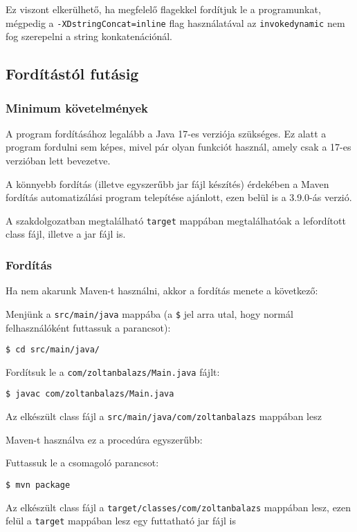 Ez viszont elkerülhető, ha megfelelő flagekkel fordítjuk le a programunkat, mégpedig a \lstinline{-XDstringConcat=inline} flag használatával az \lstinline{invokedynamic} nem fog szerepelni a string konkatenációnál.

\subsection{Fordítástól futásig}

\subsubsection{Minimum követelmények}

A program fordításához legalább a Java 17-es verziója szükséges. Ez alatt a program fordulni sem képes, mivel pár olyan funkciót használ, amely csak a 17-es verzióban lett bevezetve.

A könnyebb fordítás (illetve egyszerűbb jar fájl készítés) érdekében a Maven fordítás automatizálási program telepítése ajánlott, ezen belül is a 3.9.0-ás verzió.

A szakdolgozatban megtalálható \lstinline{target} mappában megtalálhatóak a lefordított class fájl, illetve a jar fájl is.

\subsubsection{Fordítás}

Ha nem akarunk Maven-t használni, akkor a fordítás menete a következő:
\begin{compactitem}
	\item Menjünk a \lstinline{src/main/java} mappába (a \lstinline{$} jel arra utal, hogy normál felhasználóként futtassuk a parancsot): 
	\begin{verbatim}
$ cd src/main/java/
	\end{verbatim}
	\item Fordítsuk le a \lstinline{com/zoltanbalazs/Main.java} fájlt:
	\begin{verbatim}
$ javac com/zoltanbalazs/Main.java
	\end{verbatim}
	\item Az elkészült class fájl a \lstinline{src/main/java/com/zoltanbalazs} mappában lesz 
\end{compactitem}

Maven-t használva ez a procedúra egyszerűbb:
\begin{compactitem}
	\item Futtassuk le a csomagoló parancsot:
	\begin{verbatim}
$ mvn package
	\end{verbatim}
	\item Az elkészült class fájl a \lstinline{target/classes/com/zoltanbalazs} mappában lesz, ezen felül a \lstinline{target} mappában lesz egy futtatható jar fájl is
\end{compactitem}

